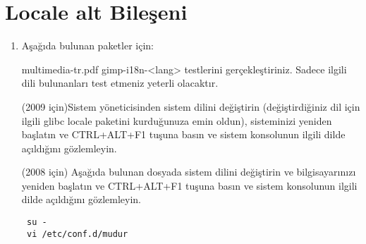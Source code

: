 \documentclass[a4paper,10pt]{article}
\begin{document}
\section{Locale alt Bileşeni}
\begin{enumerate}
 \item Aşağıda bulunan paketler için:

multimedia-tr.pdf gimp-i18n-<lang> testlerini gerçekleştiriniz. Sadece ilgili dili bulunanları test etmeniz yeterli olacaktır.

(2009 için)Sistem yöneticisinden sistem dilini değiştirin (değiştirdiğiniz dil için ilgili glibc locale paketini kurduğunuza emin oldun), sisteminizi yeniden başlatın ve CTRL+ALT+F1 tuşuna basın ve sistem konsolunun ilgili dilde açıldığını gözlemleyin.

(2008 için) Aşağıda bulunan dosyada sistem dilini değiştirin ve bilgisayarınızı yeniden başlatın ve CTRL+ALT+F1 tuşuna basın ve sistem konsolunun ilgili dilde açıldığını gözlemleyin.
\begin{verbatim}
 su -
 vi /etc/conf.d/mudur
\end{verbatim}


\end{enumerate}
\end{document}
